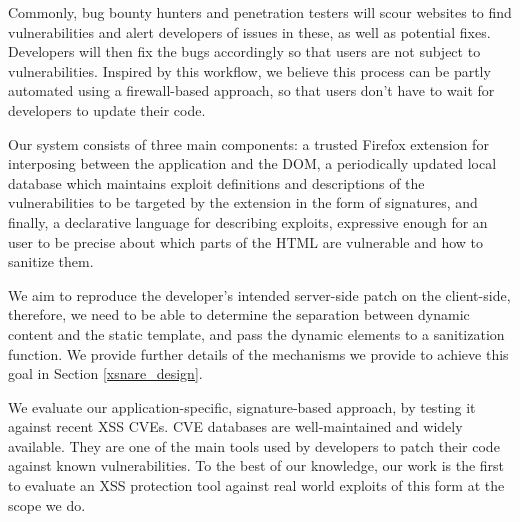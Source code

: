 Commonly, bug bounty hunters and penetration testers will scour
websites to find vulnerabilities and alert developers of issues in
these, as well as potential fixes. Developers will then fix the bugs
accordingly so that users are not subject to vulnerabilities. Inspired
by this workflow, we believe this process can be partly automated
using a firewall-based approach, so that users don't have to wait for
developers to update their code.

Our system consists of three main components: a trusted Firefox
extension for interposing between the application and the DOM, a
periodically updated local database which maintains exploit
definitions and descriptions of the vulnerabilities to be targeted by
the extension in the form of signatures, and finally, a declarative
language for describing exploits, expressive enough for an user to be
precise about which parts of the HTML are vulnerable and how to
sanitize them.

We aim to reproduce the developer's intended server-side patch on the
client-side, therefore, we need to be able to determine the separation
between dynamic content and the static template, and pass the dynamic
elements to a sanitization function. We provide further details of the
mechanisms we provide to achieve this goal in Section
\ref{xsnare_design}.

We evaluate our application-specific, signature-based approach, by
testing it against recent \ac{XSS} CVEs. CVE databases are well-maintained
and widely available. They are one of the main tools used by
developers to patch their code against known vulnerabilities. To the
best of our knowledge, our work is the first to evaluate an \ac{XSS}
protection tool against real world exploits of this form at the scope
we do.


